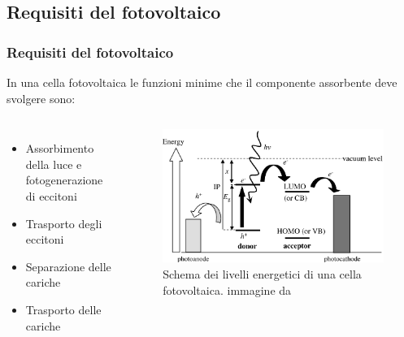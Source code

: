 \documentclass{beamer}
\begin{document}
  \subsection{Requisiti del fotovoltaico}
    \begin{frame}
      \frametitle{Requisiti del fotovoltaico}
      In una cella fotovoltaica le funzioni minime che il componente assorbente deve svolgere sono:
      \begin{columns}
	\begin{itemize}
	  \item Assorbimento della luce e fotogenerazione di eccitoni
	  \item Trasporto degli eccitoni
	  \item Separazione delle cariche
	  \item Trasporto delle cariche
	\end{itemize}
	\begin{figure}
	 \includegraphics[scale=0.25]{immagini/livelli.png}\caption{Schema dei livelli energetici di una cella fotovoltaica. \tiny{immagine da \citep{fv-all}}}
	\end{figure}

      \end{columns}
    \end{frame}
\end{document}
